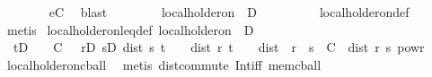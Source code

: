 \begin{isabellebody}
\ \ \ \ \ \ \isamarkupfalse%
\ eC\ \isamarkupfalse%
\ blast\isanewline
\ \ \isacommand{{\isacharbraceright}{\kern0pt}}\isamarkupfalse%
\isanewline
\ \ \isamarkupfalse%
\ \isamarkupfalse%
\ {\isachardoublequoteopen}local{\isacharunderscore}{\kern0pt}holder{\isacharunderscore}{\kern0pt}on\ {\isasymgamma}\ D\ {\isasymphi}{\isachardoublequoteclose}\isanewline
\ \ \ \ \isamarkupfalse%
\ {\isacharasterisk}{\kern0pt}\ \isamarkupfalse%
\ local{\isacharunderscore}{\kern0pt}holder{\isacharunderscore}{\kern0pt}on{\isacharunderscore}{\kern0pt}def\ \isamarkupfalse%
\ metis\isanewline
{}\isamarkupfalse%
%
\endisatagproof
{\isafoldproof}%
%
\isadelimproof
\isanewline
%
\endisadelimproof
\isanewline
{}\isamarkupfalse%
\ local{\isacharunderscore}{\kern0pt}holder{\isacharunderscore}{\kern0pt}on{\isacharunderscore}{\kern0pt}leq{\isacharunderscore}{\kern0pt}def{\isacharcolon}{\kern0pt}\ {\isachardoublequoteopen}local{\isacharunderscore}{\kern0pt}holder{\isacharunderscore}{\kern0pt}on\ {\isasymgamma}\ D\ {\isasymphi}\ {\isasymlongleftrightarrow}\ {\isasymgamma}\ {\isasymin}\ {\isacharbraceleft}{\kern0pt}{}{\isacharless}{\kern0pt}{\isachardot}{\kern0pt}{\isachardot}{\kern0pt}{}{\isacharbraceright}{\kern0pt}\ {\isasymand}\isanewline
\ \ {\isacharparenleft}{\kern0pt}{\isasymforall}t{\isasymin}D{\isachardot}{\kern0pt}\ {\isasymexists}{\isasymepsilon}\ {\isachargreater}{\kern0pt}\ {}{\isachardot}{\kern0pt}\ {\isasymexists}C\ {\isasymge}\ {}{\isachardot}{\kern0pt}\ {\isacharparenleft}{\kern0pt}{\isasymforall}r{\isasymin}D{\isachardot}{\kern0pt}\ {\isasymforall}s{\isasymin}D{\isachardot}{\kern0pt}\ dist\ s\ t\ {\isasymle}\ {\isasymepsilon}\ {\isasymand}\ dist\ r\ t\ {\isasymle}\ {\isasymepsilon}\ {\isasymlongrightarrow}\ dist\ {\isacharparenleft}{\kern0pt}{\isasymphi}\ r{\isacharparenright}{\kern0pt}\ {\isacharparenleft}{\kern0pt}{\isasymphi}\ s{\isacharparenright}{\kern0pt}\ {\isasymle}\ C\ {\isacharasterisk}{\kern0pt}\ dist\ r\ s\ powr\ {\isasymgamma}{\isacharparenright}{\kern0pt}{\isacharparenright}{\kern0pt}{\isachardoublequoteclose}\isanewline
%
\isadelimproof
\ \ %
\endisadelimproof
%
\isatagproof
{}\isamarkupfalse%
\ local{\isacharunderscore}{\kern0pt}holder{\isacharunderscore}{\kern0pt}on{\isacharunderscore}{\kern0pt}cball\ \isamarkupfalse%
\ {\isacharparenleft}{\kern0pt}metis\ dist{\isacharunderscore}{\kern0pt}commute\ Int{\isacharunderscore}{\kern0pt}iff\ mem{\isacharunderscore}{\kern0pt}cball{\isacharparenright}{\kern0pt}%

\end{isabellebody}
